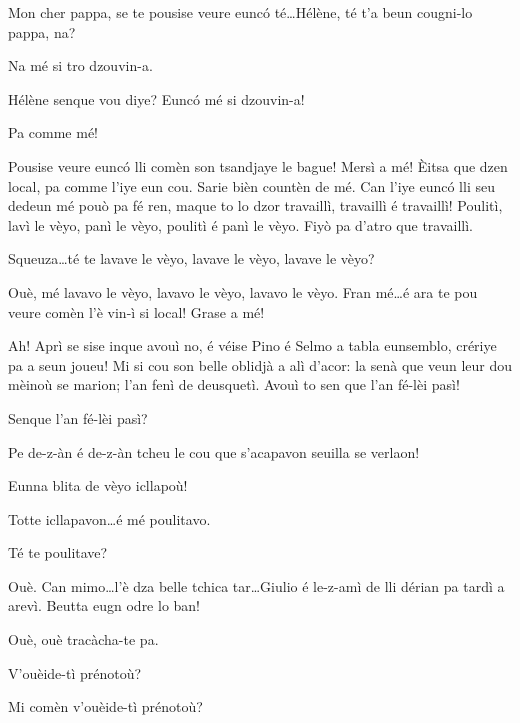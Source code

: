 \begin{drama}
\Bertaspeaks Mon cher pappa, se te pousise veure eunc\'o té\ldots Hélène, té t'a beun cougni-lo pappa, na?

\Helenespeaks Na mé si tro dzouvin-a.

\Bertaspeaks Hélène senque vou diye? Eunc\'o mé si dzouvin-a!

\Helenespeaks Pa comme mé!

\Bertaspeaks{} Pousise veure eunc\'o lli comèn son tsandjaye le bague! Mersì a mé! \`Eitsa que dzen local, pa comme l'iye eun cou. Sarie bièn countèn de mé. Can l'iye eunc\'o lli seu dedeun mé pouò pa fé ren, maque to lo dzor travaillì, travaillì é travaillì! Poulitì, lavì le vèyo, panì le vèyo, poulitì é panì le vèyo. Fiyò pa d'atro que travaillì.

\Helenespeaks{} Squeuza\ldots té te lavave le vèyo, lavave le vèyo, lavave le vèyo?

\Bertaspeaks Ouè, mé lavavo le vèyo, lavavo le vèyo, lavavo le vèyo. Fran mé\ldots é ara te pou veure comèn l'è vin-ì si local! Grase a mé!

\Bertaspeaks Ah! Aprì se sise inque avouì no, é véise Pino é Selmo a tabla eunsemblo, crériye pa a seun joueu! Mi si cou son belle oblidjà a alì d'acor: la senà que veun leur dou mèinoù se marion; l'an fenì de deusquetì. Avouì to sen que l'an fé-lèi pasì!

\Helenespeaks Senque l'an fé-lèi pasì?

\Bertaspeaks Pe de-z-àn é de-z-àn tcheu le cou que s'acapavon seuilla se verlaon!

\Dorinaspeaks Eunna blita de vèyo icllapoù!

\Bertaspeaks Totte icllapavon\ldots é mé poulitavo.

\Helenespeaks Té te poulitave?

\Bertaspeaks Ouè. Can mimo\ldots l'è dza belle tchica tar\ldots Giulio é le-z-amì de lli dérian pa tardì a arevì. Beutta eugn odre lo ban!

\Helenespeaks Ouè, ouè tracàcha-te pa.



\Dorinaspeaks{} V'ouèide-tì prénotoù?

\Federicospeaks{} Mi comèn v'ouèide-tì prénotoù? 


\end{drama}
